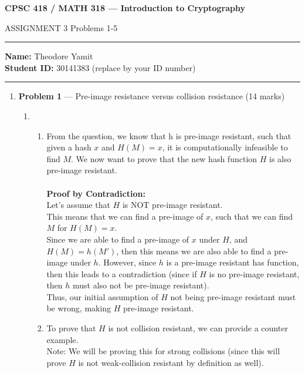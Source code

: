 \documentclass[11pt]{article}
\theoremstyle{definition}
\begin{document}
\begin{center}
{\bf \Large CPSC 418 / MATH 318 --- Introduction to Cryptography

ASSIGNMENT 3 \qquad Problems 1-5}
\end{center}

\hrule 	

\textbf{Name:} Theodore Yamit \\
\textbf{Student ID:} 30141383 (replace by your ID number)

\medskip \hrule

\begin{enumerate} \itemsep 20pt

\item[] \textbf{Problem 1} --- Pre-image resistance versus collision resistance (14 marks)

\begin{enumerate}

\item \begin{enumerate}

\item From the question, we know that h is pre-image resistant, such that given a hash $x$ and $H(M) = x$, it is computationally infeasible to find $M$. We now want to prove that the new hash function $H$ is also pre-image resistant.\\\\
\textbf{Proof by Contradiction:}\\
Let's assume that $H$ is NOT pre-image resistant.\\
This means that we can find a pre-image of $x$, such that we can find $M$ for $H(M) = x$.\\

Since we are able to find a pre-image of $x$ under $H$, and $H(M) = h(M')$, then this means we are also able to find a pre-image under $h$. However, since $h$ is a pre-image resistant has function, then this leads to a contradiction (since if $H$ is no pre-image resistant, then $h$ must also not be pre-image resistant).\\

Thus, our initial assumption of $H$ not being pre-image resistant must be wrong, making $H$ pre-image resistant.\\

\item To prove that $H$ is not collision resistant, we can provide a counter example.\\
Note: We will be proving this for strong collisions (since this will prove $H$ is not weak-collision resistant by definition as well).\\


\end{enumerate}
\end{enumerate}
\end{enumerate}
\end{document}
